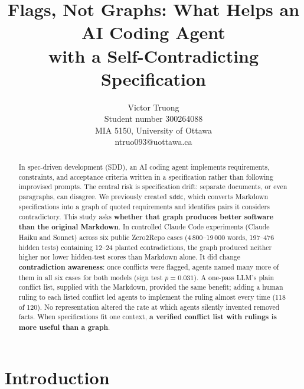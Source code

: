 \documentclass{article}
\title{Flags, Not Graphs: What Helps an AI Coding Agent\\with a Self-Contradicting Specification}
\author{%
  Victor Truong \\
  Student number 300264088 \\
  MIA 5150, University of Ottawa \\
  ntruo093@uottawa.ca \\
}
\newcommand{\code}[1]{\texttt{#1}}
\begin{document}
\maketitle

\begin{abstract}
In spec-driven development (SDD), an AI coding agent implements requirements, constraints, and acceptance criteria written in a specification rather than following improvised prompts. The central risk is specification drift: separate documents, or even paragraphs, can disagree. We previously created \code{sddc}, which converts Markdown specifications into a graph of quoted requirements and identifies pairs it considers contradictory. This study asks \textbf{whether that graph produces better software than the original Markdown}. In controlled Claude Code experiments (Claude Haiku and Sonnet) across six public Zero2Repo cases (4\,800--19\,000 words, 197--476 hidden tests) containing 12--24 planted contradictions, the graph produced neither higher nor lower hidden-test scores than Markdown alone. It did change \textbf{contradiction awareness}: once conflicts were flagged, agents named many more of them in all six cases for both models (sign test $p = 0.031$). A one-pass LLM's plain conflict list, supplied with the Markdown, provided the same benefit; adding a human ruling to each listed conflict led agents to implement the ruling almost every time (118 of 120). No representation altered the rate at which agents silently invented removed facts. When specifications fit one context, \textbf{a verified conflict list with rulings is more useful than a graph}.
\end{abstract}

\section{Introduction}
\end{document}
